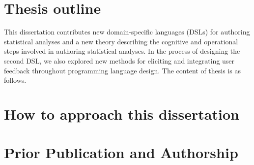 \section{Thesis outline}
This dissertation contributes new domain-specific languages (DSLs) for authoring
statistical analyses and a new theory describing the cognitive and operational
steps involved in authoring statistical analyses. In the process of designing
the second DSL, we also explored new methods for eliciting and integrating user
feedback throughout programming language design. The content of thesis is as
follows. 


\section*{How to approach this dissertation} 

\section{Prior Publication and Authorship} 